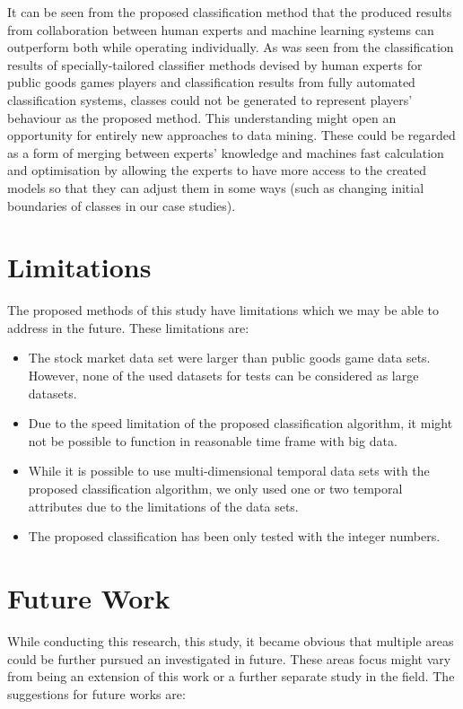 It can be seen from the proposed classification method that the produced results from collaboration between human experts and machine learning systems can outperform both while operating individually. As was seen from the classification results of specially-tailored classifier methods devised by human experts for public goods games players and classification results from fully automated classification systems, classes could not be generated to represent players' behaviour as the proposed method. This understanding might open an opportunity for entirely new approaches to data mining. These could be regarded as a form of merging between experts' knowledge and machines fast calculation and optimisation by allowing the experts to have more access to the created models so that they can adjust them in some ways (such as changing initial boundaries of classes in our case studies).

\section{Limitations}

The proposed methods of this study have limitations which we may be able to address in the future. These limitations are:

\begin{itemize}
    
    \item The stock market data set were larger than public goods game data sets. However, none of the used datasets for tests can be considered as large datasets.
    
    \item Due to the speed limitation of the proposed classification algorithm, it might not be possible to function in reasonable time frame with big data.
    
    \item While it is possible to use multi-dimensional temporal data sets with the proposed classification algorithm, we only used one or two temporal attributes due to the limitations of the data sets.
    
    \item The proposed classification has been only tested with the integer numbers.
    
    
\end{itemize}

\section{Future Work}
While conducting this research, this study, it became obvious that multiple areas could be further pursued an investigated in future. These areas focus might vary from being an extension of this work or a further separate study in the field. The suggestions for future works are:

